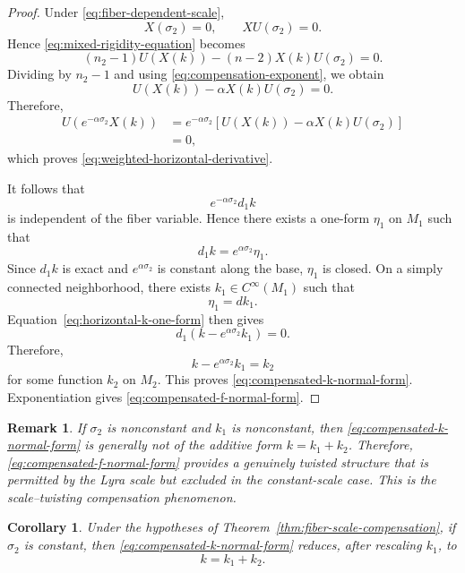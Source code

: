 \documentclass[a4paper,11pt]{article}
\theoremstyle{plain}
\newtheorem{corollary} {Corollary}[section]
\newtheorem{remark}{Remark}[section]
\numberwithin{equation}{section}
\begin{document}
\begin{proof}
	Under \eqref{eq:fiber-dependent-scale},
	\[
	X(\sigma_{2})=0,
	\qquad
	XU(\sigma_{2})=0.
	\]
	Hence \eqref{eq:mixed-rigidity-equation} becomes
	\begin{equation}
		(n_{2}-1)U(X(k))
		-
		(n-2)X(k)U(\sigma_{2})
		=
		0.
		\label{eq:fiber-scale-mixed-reduced}
	\end{equation}
	Dividing by \(n_{2}-1\) and using
	\eqref{eq:compensation-exponent}, we obtain
	\[
	U(X(k))
	-
	\alpha X(k)U(\sigma_{2})
	=
	0.
	\]
	Therefore,
	\begin{align*}
		U\!\left(
		e^{-\alpha\sigma_{2}}X(k)
		\right)
		&=
		e^{-\alpha\sigma_{2}}
		\left[
		U(X(k))
		-
		\alpha X(k)U(\sigma_{2})
		\right]
		\\
		&=0,
	\end{align*}
	which proves \eqref{eq:weighted-horizontal-derivative}.
	
	It follows that
	\[
	e^{-\alpha\sigma_{2}}d_{1}k
	\]
	is independent of the fiber variable. Hence there exists a
	one-form \(\eta_{1}\) on \(M_{1}\) such that
	\begin{equation}
		d_{1}k
		=
		e^{\alpha\sigma_{2}}\eta_{1}.
		\label{eq:horizontal-k-one-form}
	\end{equation}
	Since \(d_{1}k\) is exact and
	\(e^{\alpha\sigma_{2}}\) is constant along the base,
	\(\eta_{1}\) is closed. On a simply connected neighborhood,
	there exists \(k_{1}\in C^{\infty}(M_{1})\) such that
	\[
	\eta_{1}=dk_{1}.
	\]
	Equation~\eqref{eq:horizontal-k-one-form} then gives
	\[
	d_{1}
	\left(
	k-e^{\alpha\sigma_{2}}k_{1}
	\right)
	=
	0.
	\]
	Therefore,
	\[
	k-e^{\alpha\sigma_{2}}k_{1}
	=
	k_{2}
	\]
	for some function \(k_{2}\) on \(M_{2}\). This proves
	\eqref{eq:compensated-k-normal-form}. Exponentiation gives
	\eqref{eq:compensated-f-normal-form}.
\end{proof}

\begin{remark}
	\label{rem:genuine-compensation}
	If \(\sigma_{2}\) is nonconstant and \(k_{1}\) is nonconstant,
	then \eqref{eq:compensated-k-normal-form} is generally not of
	the additive form \(k=k_{1}+k_{2}\). Therefore,
	\eqref{eq:compensated-f-normal-form} provides a genuinely
	twisted structure that is permitted by the Lyra scale but
	excluded in the constant-scale case. This is the
	\emph{scale--twisting compensation phenomenon}.
\end{remark}

\begin{corollary}
	\label{cor:fiber-scale-constant-reduction}
	Under the hypotheses of
	Theorem~\ref{thm:fiber-scale-compensation}, if
	\(\sigma_{2}\) is constant, then
	\eqref{eq:compensated-k-normal-form} reduces, after rescaling
	\(k_{1}\), to
	\[
	k=k_{1}+k_{2}.
	\]
\end{corollary}
\end{document}
